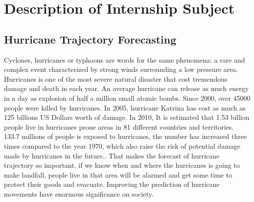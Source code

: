 \chapter{Description of Internship Subject}
\label{sec:chapter2}

\section{Hurricane Trajectory Forecasting}
\label{sec:chapter2_1}
Cyclones, hurricanes or typhoons are words for the same phenomena: a rare and complex event characterized by strong winds surrounding a low pressure area. Hurricanes is one of the most severe natural disaster that cost tremendous damage and death in each year. An average hurricane can release as much energy in a day as explosion of half a million small atomic bombs. Since 2000, over 45000 people were killed by hurricanes. In 2005, hurricane Katrina has cost as much as 125 billions US Dollars worth of damage. In 2010, It is estimated that 1.53 billion people live in hurricanes prone areas in 81 different countries and territories. 133.7 millions of people is exposed to hurricanes, the number has increased three times compared to the year 1970, which also raise the risk of potential damage made by hurricanes in the future.\cite{peduzzi2012global}. That makes the forecast of hurricane trajectory so important, if we know when and where the hurricanes is going to make landfall, people live in that area will be alarmed and get some time to protect their goods and evacuate. Improving the prediction of hurricane movements have enormous significance on society.


